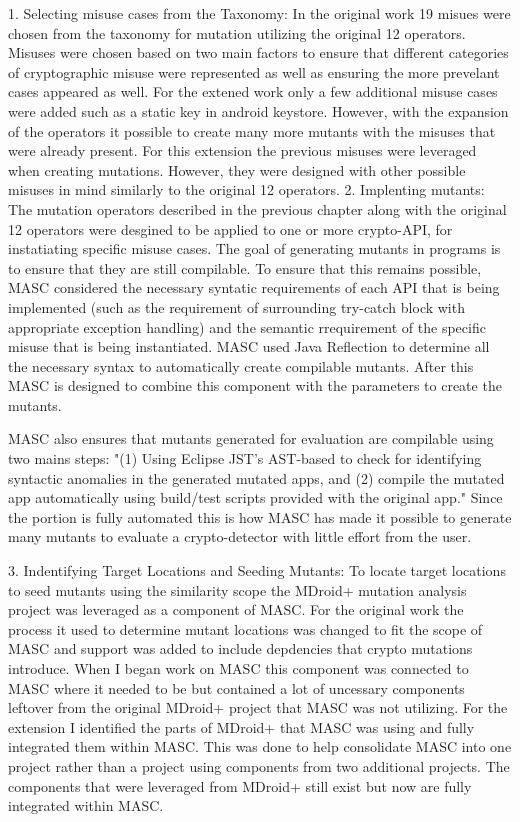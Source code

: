 1. Selecting misuse cases from the Taxonomy: In the original work 19 misues were chosen from the taxonomy for mutation utilizing the original 12 operators. Misuses were chosen based on two main factors to ensure that different categories of cryptographic misuse were represented as well as ensuring the more prevelant cases appeared as well. For the extened work only a few additional misuse cases were added such as a static key in android keystore. However, with the expansion of the operators it possible to create many more mutants with the misuses that were already present. For this extension the previous misuses were leveraged when creating mutations. However, they were designed with other possible misuses in mind similarly to the original 12 operators.
2. Implenting mutants: The mutation operators described in the previous chapter along with the original 12 operators were desgined to be applied to one or more crypto-API, for instatiating specific misuse cases. The goal of generating mutants in programs is to ensure that they are still compilable. To ensure that this remains possible, MASC considered the necessary syntatic requirements of each API that is being implemented (such as the requirement of surrounding try-catch block with appropriate exception handling) and the semantic rrequirement of the specific misuse that is being instantiated. MASC used Java Reflection to determine all the necessary syntax to automatically create compilable mutants. After this MASC is designed to combine this component with the parameters to create the mutants.

MASC also ensures that mutants generated for evaluation are compilable using two mains steps: "(1) Using Eclipse JST's AST-based to check for identifying syntactic anomalies in the generated mutated apps, and (2) compile the mutated app automatically using build/test scripts provided with the original app." Since the portion is fully automated this is how MASC has made it possible to generate many mutants to evaluate a crypto-detector with little effort from the user.

3. Indentifying Target Locations and Seeding Mutants: To locate target locations to seed mutants using the similarity scope the MDroid+ mutation analysis project was leveraged as a component of MASC. For the original work the process it used to determine mutant locations was changed to fit the scope of MASC and support was added to include depdencies that crypto mutations introduce. When I began work on MASC this component was connected to MASC where it needed to be but contained a lot of uncessary components leftover from the original MDroid+ project that MASC was not utilizing. For the extension I identified the parts of MDroid+ that MASC was using and fully integrated them within MASC. This was done to help consolidate MASC into one project rather than a project using components from two additional projects. The components that were leveraged from MDroid+ still exist but now are fully integrated within MASC.

